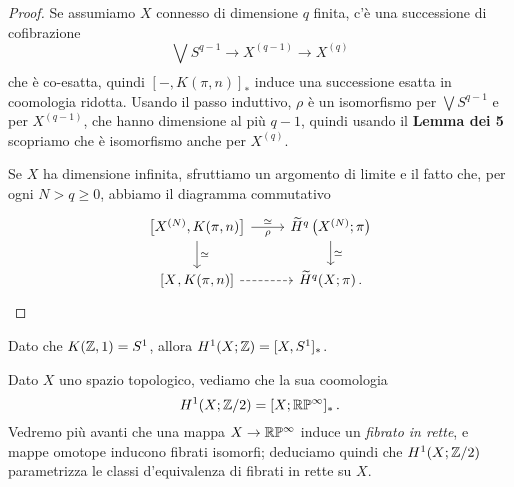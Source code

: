 \begin{thm}
\begin{proof}
		Se assumiamo $X$ connesso di dimensione $q$ finita, c'è una successione di cofibrazione
		\begin{equation*}
			\bigvee_{} S^{q-1} \longrightarrow X^{(q-1)} \longrightarrow X^{(q)}
		\end{equation*}
		che è co-esatta, quindi $[-,K(\pi,n)]_{\ast}$ induce una successione esatta in 
		coomologia ridotta. Usando il passo induttivo,
		$\rho$ è un isomorfismo per $\bigvee S^{q-1}$ e per $X^{(q-1)}$,
		che hanno dimensione al più $q-1$, quindi usando
		il \textbf{Lemma dei 5} scopriamo che è isomorfismo anche per $X^{(q)}$.
		
		Se $X$ ha dimensione infinita, sfruttiamo un argomento di limite
		e il fatto che, per ogni $N > q \ge 0$, abbiamo il diagramma commutativo
		\begin{equation*}
			\begin{tikzcd}
				{\left[ X^{(N)}, K(\pi,n) \right] } \ar[r, "\simeq", "\rho"'] \ar[d, "\simeq"]
				& {\widetilde{H}^{q}\left(X^{(N)};\pi\right)} \ar[d, "\simeq"] \\
				{\left[ X^{}, K(\pi,n) \right] } \ar[r, dashed]
				& \widetilde{H}^{q}(X;\pi)\,.
			\end{tikzcd}
		\end{equation*}
		\end{proof}
	\end{thm}
	
	\begin{ex}
		Dato che $K({\mathbb Z},1) = S^{1}$, allora $H^{1}(X;{\mathbb Z}) = [X,S^{1}]_{\ast}$.
	\end{ex}
	
	\begin{ex}
		Dato $X$ uno spazio topologico, vediamo che la sua coomologia
		\begin{equation*}
			H^{1}(X;{\mathbb Z}/2) = [X;{\mathbb R}\mathbb{P}^{\infty}]_{\ast}\,.
		\end{equation*}
		Vedremo più avanti che una mappa $X \to {\mathbb R}\mathbb{P}^{\infty}$
		induce un \emph{fibrato in rette}, e mappe omotope
		inducono fibrati isomorfi; deduciamo quindi che 
		$H^{1}(X;{\mathbb Z}/2)$ parametrizza le classi d'equivalenza di fibrati in rette su $X$.
	\end{ex}






